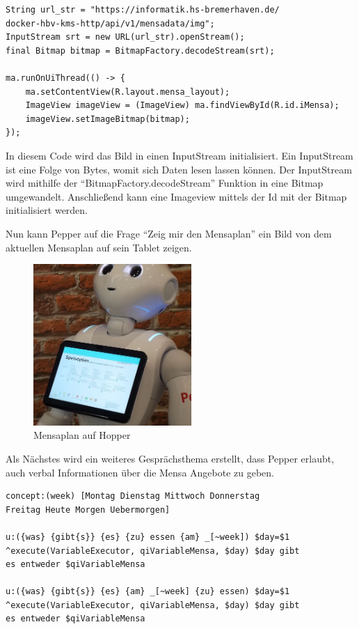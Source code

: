 \begin{lstlisting}
String url_str = "https://informatik.hs-bremerhaven.de/
docker-hbv-kms-http/api/v1/mensadata/img";
InputStream srt = new URL(url_str).openStream();
final Bitmap bitmap = BitmapFactory.decodeStream(srt);
    
ma.runOnUiThread(() -> {
    ma.setContentView(R.layout.mensa_layout);
    ImageView imageView = (ImageView) ma.findViewById(R.id.iMensa);
    imageView.setImageBitmap(bitmap);
});
\end{lstlisting}

In diesem Code wird das Bild in einen InputStream initialisiert. Ein InputStream ist eine Folge von Bytes, womit sich Daten lesen 
lassen können. Der InputStream wird mithilfe der ``BitmapFactory.decodeStream'' Funktion in eine Bitmap umgewandelt. 
Anschließend kann eine Imageview mittels der Id mit der Bitmap initialisiert werden. 

Nun kann Pepper auf die Frage ``Zeig mir den Mensaplan'' ein Bild von dem aktuellen Mensaplan auf sein Tablet zeigen. 

\begin{figure}[H]
    \centering
    \includegraphics[width=6cm]{Figures/AppChapter/rx2.JPG}
    \caption{Mensaplan auf Hopper}
    \label{fig:mensaplanPepper}
    \centering
\end{figure}

Als Nächstes wird ein weiteres Gesprächsthema erstellt, dass Pepper erlaubt, auch verbal Informationen über die Mensa Angebote zu geben.

\begin{lstlisting}
concept:(week) [Montag Dienstag Mittwoch Donnerstag 
Freitag Heute Morgen Uebermorgen]

u:({was} {gibt{s}} {es} {zu} essen {am} _[~week]) $day=$1 
^execute(VariableExecutor, qiVariableMensa, $day) $day gibt 
es entweder $qiVariableMensa

u:({was} {gibt{s}} {es} {am} _[~week] {zu} essen) $day=$1 
^execute(VariableExecutor, qiVariableMensa, $day) $day gibt 
es entweder $qiVariableMensa
\end{lstlisting}

